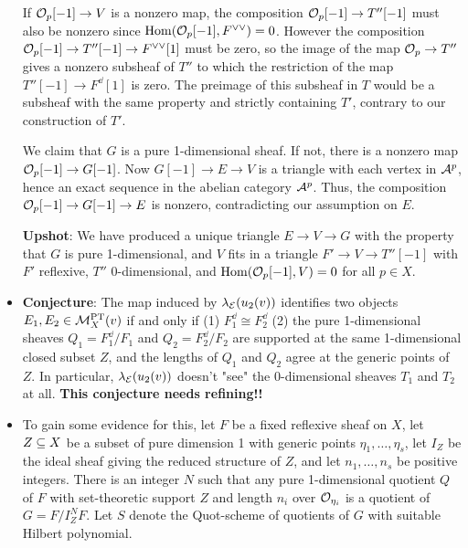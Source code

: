 \begin{itemize}
    If $\mathcal{O}_p[-1] \to V$ is a nonzero map, the composition $\mathcal{O}_p[-1] \to T''[-1]$ must also be nonzero since $\mathrm{Hom}(\mathcal{O}_p[-1], F^{\vee\vee}) = 0$. However the composition $\mathcal{O}_p[-1] \to T''[-1] \to F^{\vee\vee}[1]$ must be zero, so the image of the map $\mathcal{O}_p \to T''$ gives a nonzero subsheaf of $T''$ to which the restriction of the map $T''[-1] \to F^\dd[1]$ is zero. The preimage of this subsheaf in $T$ would be a subsheaf with the same property and strictly containing $T'$, contrary to our construction of $T'$.
    
    We claim that $G$ is a pure 1-dimensional sheaf. If not, there is a nonzero map $\mathcal{O}_p[-1] \to G[-1]$. Now $G[-1] \to E \to V$ is a triangle with each vertex in $\mathcal{A}^p$, hence an exact sequence in the abelian category $\mathcal{A}^p$. Thus, the composition $\mathcal{O}_p[-1] \to G[-1] \to E$ is nonzero, contradicting our assumption on $E$.
    
    \textbf{Upshot}: We have produced a unique triangle $E \to V \to G$ with the property that $G$ is pure 1-dimensional, and $V$ fits in a triangle $F' \to V \to T''[-1]$ with $F'$ reflexive, $T''$ 0-dimensional, and $\mathrm{Hom}(\mathcal{O}_p[-1], V) = 0$ for all $p \in X$. 
    
    \item \textbf{Conjecture}: The map induced by $\lambda_{\mathcal{E}}(u_2(v))$ identifies two objects $E_1, E_2 \in \mathcal{M}^{\text{PT}}_X(v)$ if and only if (1) $F_1^\dd \cong F_2^\dd$ (2) the pure 1-dimensional sheaves $Q_1 = F_1^\dd/F_1$ and $Q_2 = F_2^\dd/F_2$ are supported at the same 1-dimensional closed subset $Z$, and the lengths of $Q_1$ and $Q_2$ agree at the generic points of $Z$. In particular, $\lambda_{\mathcal{E}}(u_2(v))$ doesn't "see" the 0-dimensional sheaves $T_1$ and $T_2$ at all. \textbf{This conjecture needs refining!!}
    
    \item To gain some evidence for this, let $F$ be a fixed reflexive sheaf on $X$, let $Z \subseteq X$ be a subset of pure dimension 1 with generic points $\eta_1, \ldots, \eta_s$, let $I_Z$ be the ideal sheaf giving the reduced structure of $Z$, and let $n_1,\ldots, n_s$ be positive integers. There is an integer $N$ such that any pure 1-dimensional quotient $Q$ of $F$ with set-theoretic support $Z$ and length $n_i$ over $\mathcal{O}_{\eta_i}$ is a quotient of $G = F/ I_Z^N F$. Let $S$ denote the Quot-scheme of quotients of $G$ with suitable Hilbert polynomial.
\end{itemize}


